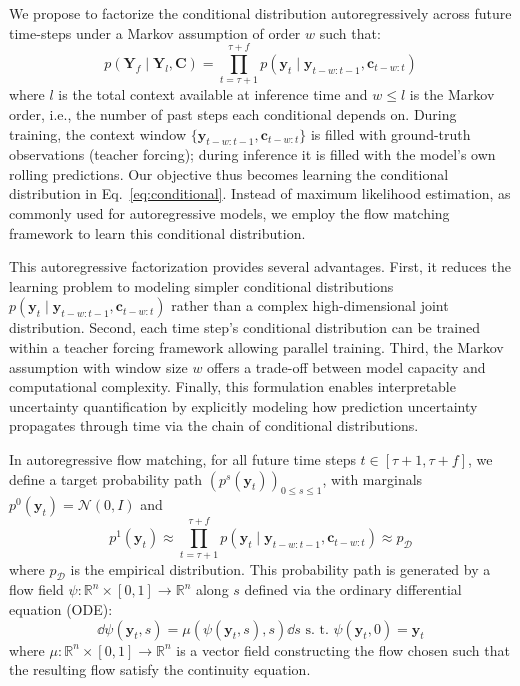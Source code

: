 \documentclass[preprint,12pt,authoryear]{elsarticle}
\newcommand{\oldrev}[1]{#1}
\begin{document}
We propose to factorize the conditional distribution autoregressively across future time-steps under a Markov assumption of order $w$ such that:
\begin{equation}
p(\mathbf{Y}_f \mid \mathbf{Y}_l, \mathbf{C}) = \prod_{t=\tau+1}^{\tau+f} p(\mathbf{y}_{t} \mid \mathbf{y}_{t-w:t-1}, \mathbf{c}_{t-w:t})
\label{eq:conditional}
\end{equation}
where \oldrev{$l$ is the total context available at inference time and $w \le l$ is the Markov order, i.e., the number of past steps each conditional depends on. During training, the context window $\{\mathbf{y}_{t-w:t-1}, \mathbf{c}_{t-w:t}\}$ is filled with ground-truth observations (teacher forcing); during inference it is filled with the model's own rolling predictions.}
Our objective thus becomes learning the conditional distribution in Eq.~\eqref{eq:conditional}. 
Instead of maximum likelihood estimation, as commonly used for autoregressive models, we employ the flow matching framework to learn this conditional distribution.


This autoregressive factorization provides several advantages. First, it reduces the learning problem to modeling simpler conditional distributions $p(\mathbf{y}_{t} \mid \mathbf{y}_{t-w:t-1}, \mathbf{c}_{t-w:t})$ rather than a complex high-dimensional joint distribution. Second, each time step's conditional distribution can be trained within a teacher forcing framework allowing parallel training. Third, the Markov assumption with window size $w$ offers a trade-off between model capacity and computational complexity. Finally, this formulation enables interpretable uncertainty quantification by explicitly modeling how prediction uncertainty propagates through time via the chain of conditional distributions. 


In autoregressive flow matching, for all future time steps $t \in [\tau+1, \tau+f]$, we define a target probability path $(p^s(\mathbf{y}_t))_{0\le s \le 1}$, with marginals $p^0(\mathbf{y}_t) = \mathcal{N}(0,I)$ and  $$p^1(\mathbf{y}_t) \approx \prod_{t=\tau+1}^{\tau+f}p(\mathbf{y}_{t} \mid \mathbf{y}_{t-w:t-1}, \mathbf{c}_{t-w:t}) \approx p_\mathcal{D}$$ where $p_\mathcal{D}$ is the empirical distribution. This probability path is generated by a flow field $\psi\colon \mathbb{R}^n \times [0,1] \to \mathbb{R}^n$ along $s$ defined via the ordinary differential equation (ODE):
\begin{equation}\label{eq:target_flow}
\dd \psi(\mathbf{y}_{t}, s) = \mu(\psi(\mathbf{y}_{t},s),s) \dd s \text{ s.~t. } \psi(\mathbf{y}_{t}, 0) = \mathbf{y}_{t}
\end{equation}
where $\mu \colon \mathbb{R}^n \times [0,1] \to \mathbb{R}^n$ is a vector field constructing the flow chosen such that the resulting flow satisfy the continuity equation.
\end{document}
